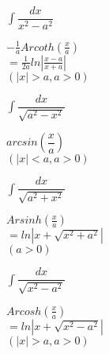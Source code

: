 \documentclass[a8paper,14pt,grid=none%
,print			%
]{kartei}
\begin{document}
	\begin{karte}{$ \int \dfrac{dx}{x^2-a^2} $}
		\begin{center}
			$ -\frac{1}{a} Arcoth\left( \frac{x}{a} \right) $\\
			$ = \frac{1}{2a}ln\left|\frac{x-a}{x+a}\right| $\\[10pt]
			$ (|x|>a, a>0) $
		\end{center}
	\end{karte}

	\begin{karte}{$ \int \dfrac{dx}{\sqrt{a^2-x^2}} $}
		\begin{center}
			$ arcsin\left( \dfrac{x}{a} \right) $ \\[10pt]
			$ (|x| < a, a > 0) $
		\end{center}
	\end{karte}

	\begin{karte}{$ \int \dfrac{dx}{\sqrt{a^2+x^2}} $}
		\begin{center}
			$ Arsinh\left( \frac{x}{a} \right) $\\
			$ = ln\left|x+\sqrt{x^2+a^2}\right| $\\[10pt]
			$ (a>0) $
		\end{center}
	\end{karte}

	\begin{karte}{$ \int \dfrac{dx}{\sqrt{x^2-a^2}} $}
		\begin{center}
			$ Arcosh\left( \frac{x}{a} \right) $\\
			$ =ln\left|x+\sqrt{x^2-a^2}\right| $\\[10pt]
			$ (|x| > a, a>0) $
		\end{center}
	\end{karte}
	
\end{document}
